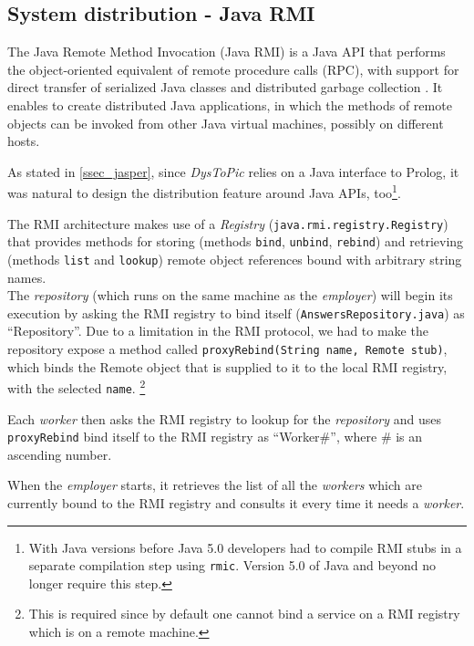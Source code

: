 \documentclass[a4paper, 11pt, oneside]{duthesis}
\begin{document}

\subsection{System distribution - Java RMI}


The Java Remote Method Invocation (Java RMI) is a Java API that performs the object-oriented equivalent of remote procedure calls (RPC), with support for direct transfer of serialized Java classes and distributed garbage collection \cite{rmi}.
It enables to create distributed Java applications, in which the methods of remote objects can be invoked from other Java virtual machines, possibly on different hosts\cite{oracle_rmi}.

As stated in \ref{ssec_jasper}, since \emph{DysToPic} relies on a Java interface to Prolog, it was natural to design the distribution feature around Java APIs, too\footnote{With Java versions before Java 5.0 developers had to compile RMI stubs in a separate compilation step using \texttt{rmic}. Version 5.0 of Java and beyond no longer require this step.}.

The RMI architecture makes use of a \emph{Registry} (\verb$java.rmi.registry.Registry$) that provides methods for storing (methods \texttt{bind}, \texttt{unbind}, \texttt{rebind}) and retrieving (methods \texttt{list} and \texttt{lookup}) remote object references bound with arbitrary string names.\\

The \emph{repository} (which runs on the same machine as the \emph{employer}) will begin its execution by asking the RMI registry to bind itself (\verb$AnswersRepository.java$) as ``Repository''.
Due to a limitation in the RMI protocol, we had to make the repository expose a method called \texttt{proxyRebind(String name, Remote stub)}, which binds the Remote object that is supplied to it to the local RMI registry, with the selected \texttt{name}.
\footnote{This is required since by default one cannot bind a service on a RMI registry which is on a remote machine.}

Each \emph{worker} then asks the RMI registry to lookup for the \emph{repository} and uses \texttt{proxyRebind} bind itself to the RMI registry as ``Worker\#'', where \# is an ascending number.

When the \emph{employer} starts, it retrieves the list of all the \emph{workers} which are currently bound to the RMI registry and consults it every time it needs a \emph{worker}.
\end{document}

